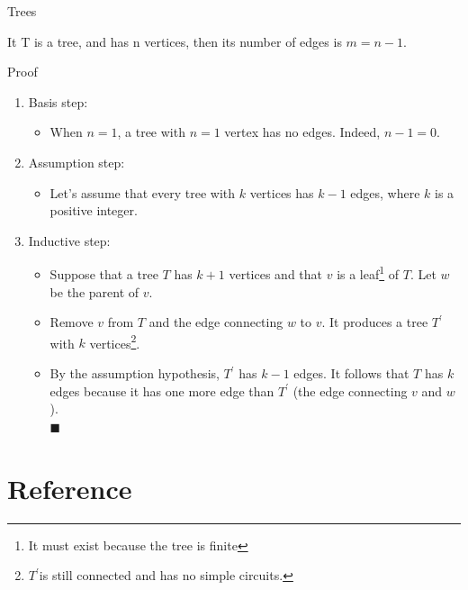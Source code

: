 \documentclass{beamer}
\theoremstyle{definition}
\begin{document}
\begin{frame}{Trees}
    \begin{lemma}
        It T is a tree, and has n vertices, then its number of edges is $m = n - 1$.
    \end{lemma}
\end{frame}

\begin{frame}{Proof}
    \begin{enumerate}[<+->]
        \item Basis step: 
        \begin{itemize}
            \item When $n = 1$, a tree with $n = 1$ vertex has no edges.  Indeed, $n -1 = 0$.
        \end{itemize}
        \item Assumption step:
        \begin{itemize}
            \item Let's assume that every tree with $k$ vertices has $k - 1$ edges, where $k$ is a positive integer.
        \end{itemize}
        \item Inductive step: 
        \begin{itemize}
            \item Suppose that a tree $T$ has $k + 1$ vertices and that $v$ is a leaf\footnote{{\tiny It must exist because the tree is finite}} of $T$.  Let $w$ be the parent of $v$. 
            \item Remove $v$ from $T$ and the edge connecting $w$ to $v$. It produces a tree $T^\prime$ with $k$ vertices\footnote{ {\tiny $T^\prime$is still connected and has no simple circuits.}}. 
            \item By the assumption hypothesis, $T^\prime$ has $k - 1$ edges. It follows that $T$ has $k$ edges because it has one more edge than $T^\prime$ (the edge connecting $v$ and $w$). \\ \hspace{10cm} {\tiny $\blacksquare$}
        \end{itemize}
    \end{enumerate}
\end{frame}

\section*{Reference}
\end{document}
